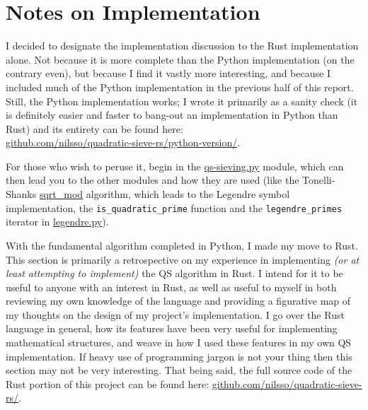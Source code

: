 \documentclass{report}
\begin{document}
\chapter{Notes on Implementation}

I decided to designate the implementation discussion to the Rust implementation alone.
Not because it is more complete than
the Python implementation (on the contrary even), but because I find it vastly
more interesting, and because I included much of the Python implementation in the previous half
of this report. Still, the Python implementation works; I wrote it primarily as a sanity
check (it is definitely easier and faster to bang-out an implementation in
Python than Rust) and its entirety can be found here:\\
\href{https://github.com/nilsso/quadratic-sieve-rs/tree/main/python-version}{github.com/nilsso/quadratic-sieve-rs/python-version/}.

For those who wish to peruse it, begin in the
\href{https://github.com/nilsso/quadratic-sieve-rs/blob/main/python-version/qs-sieving.py}{qs-sieving.py}
module, which can then lead you to the other modules and how they are used
(like the Tonelli-Shanks
\href{https://github.com/nilsso/quadratic-sieve-rs/blob/main/python-version/sqrt\_mod.py#L22}{sqrt\_mod}
algorithm, which leads to the Legendre symbol implementation, the \texttt{is_quadratic_prime}
function and the \texttt{legendre_primes} iterator in
\href{https://github.com/nilsso/quadratic-sieve-rs/blob/main/python-version/legendre.py}{legendre.py}).

With the fundamental algorithm completed in Python, I made my move to Rust.
This section is primarily a retrospective on my experience in implementing \emph{(or at
least attempting to implement)} the QS algorithm in Rust. I intend for it to be useful to anyone
with an interest in Rust, as well as useful to myself in both reviewing my own knowledge of the
language and providing a figurative map of my thoughts on the design of my project's implementation.
I go over the Rust language in general, how its features have been very useful for implementing
mathematical structures, and weave in how I used these features in my own QS implementation. If
heavy use of programming jargon is not your thing then this section may not be very interesting.
That being said, the full source code of the Rust portion of this project can be found here:
\href{https://github.com/nilsso/quadratic-sieve-rs/tree/main/src}{github.com/nilsso/quadratic-sieve-rs/}.
\end{document}
